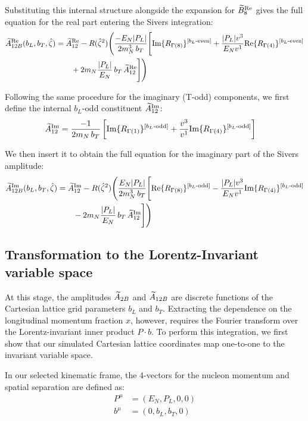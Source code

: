 Substituting this internal structure alongside the expansion for $\widetilde{B}_8^{\text{Re}}$ gives the full equation for the real part entering the Sivers integration:
\begin{align}
    \widetilde{A}_{12B}^{\text{Re}}(b_L, b_T, \hat{\zeta}) &= \widetilde{A}^{\text{Re}}_{12} - R({\hat \zeta}^2) \Bigg( \frac{-E_N |P_L|}{ 2m_N^3\, b_T }\Bigg[\text{Im}\{ R_{\Gamma(8)}\}^{[b_L\text{-even}]} + \frac{|P_L|v^3}{E_N v^1}\text{Re}\{ R_{\Gamma(4)}\}^{[b_L\text{-even}]} \nonumber \\
    & \qquad + 2m_N  \frac{|P_L|}{E_N}\, b_T\,  \widetilde{A}^{\text{Re}}_{12}\Bigg] \Bigg)
\end{align}

Following the same procedure for the imaginary (T-odd) components, we first define the internal $b_L$-odd constituent $\widetilde{A}^{\text{Im}}_{12}$:
\begin{align}
    \widetilde{A}^{\text{Im}}_{12} &= \frac{-1}{2m_N\, b_T} \left[\text{Im}\{ R_{\Gamma(1)}\}^{[b_L\text{-odd}]} + \frac{v^3}{v^1}\text{Im}\{ R_{\Gamma(4)}\}^{[b_L\text{-odd}]}\right]
\end{align}

We then insert it to obtain the full equation for the imaginary part of the Sivers amplitude:
\begin{align}
    \widetilde{A}_{12B}^{\text{Im}}(b_L, b_T, \hat{\zeta}) &= \widetilde{A}^{\text{Im}}_{12} - R({\hat \zeta}^2) \Bigg( \frac{E_N |P_L|}{ 2m_N^3\, b_T }\Bigg[\text{Re}\{ R_{\Gamma(8)}\}^{[b_L\text{-odd}]} - \frac{|P_L|v^3}{E_N v^1}\text{Im}\{ R_{\Gamma(4)}\}^{[b_L\text{-odd}]} \nonumber \\
    & \qquad - 2m_N  \frac{|P_L|}{E_N}\, b_T\,  \widetilde{A}^{\text{Im}}_{12}\Bigg] \Bigg)
\end{align}


\subsection{Transformation to the Lorentz-Invariant variable space}
\label{sec:lorentz_mapping}

At this stage, the amplitudes $\widetilde{A}_{2B}$ and $\widetilde{A}_{12B}$ are discrete functions of the Cartesian lattice grid parameters $b_L$ and $b_T$. Extracting the dependence on the longitudinal momentum fraction $x$, however, requires the Fourier transform over the Lorentz-invariant inner product $P \cdot b$. To perform this integration, we first show that our simulated Cartesian lattice coordinates map one-to-one to the invariant variable space.

In our selected kinematic frame, the 4-vectors for the nucleon momentum and spatial separation are defined as:
\begin{align}
    P^{\mu} &= (E_N, P_L, 0, 0) \\
    b^{\mu} &= (0, b_L, b_T, 0)
\end{align}

